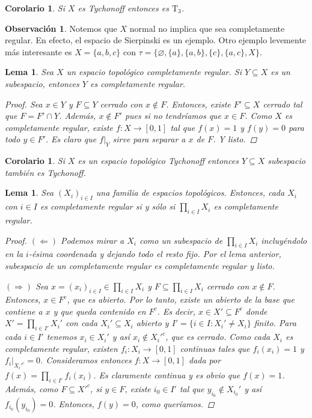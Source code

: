 \documentclass[12pt]{book}
\newtheorem{lem}[teo]{Lema}
\newtheorem{cor}[teo]{Corolario}
\theoremstyle{definition}
\newtheorem{obs}[teo]{Observación}
\let\emptyset\varnothing
\begin{document}
\begin{cor}
Si $X$ es Tychonoff entonces es $\mathrm{T}_3$.
\end{cor}

\begin{obs}
Notemos que $X$ normal no implica que sea completamente regular. En efecto, el espacio de Sierpinski es un ejemplo. Otro ejemplo levemente más interesante es $X=\{a,b,c\}$ con $\tau=\{\emptyset, \{a\}, \{a,b\}, \{c\}, \{a,c\},X\}$.
\end{obs}

\begin{lem}
Sea $X$ un espacio topológico completamente regular. Si $Y\subseteq X$ es un subespacio, entonces $Y$ es completamente regular.
\begin{proof}
Sea $x\in Y$ y $F\subseteq Y$ cerrado con $x\notin F$. Entonces, existe $F'\subseteq X$ cerrado tal que $F=F'\cap Y$. Además, $x\notin F'$ pues si no tendríamos que $x\in F$. Como $X$ es completamente regular, existe $f: X\to [0,1]$ tal que $f(x)=1$ y $f(y)=0$ para todo $y\in F'$. Es claro que $\left. f\right|_{Y}$ sirve para separar a $x$ de $F$. Y listo.
\end{proof}
\end{lem}

\begin{cor}
Si $X$ es un espacio topológico Tychonoff entonces $Y\subseteq X$ subespacio también es Tychonoff.
\end{cor}

\begin{lem}
Sea $(X_i)_{i\in I}$ una familia de espacios topológicos. Entonces, cada $X_i$ con ${i\in I}$ es completamente regular si y sólo si $\displaystyle\prod_{i\in I}X_i$ es completamente regular.
\begin{proof}
$(\Longleftarrow)$ Podemos mirar a $X_i$ como un subespacio de $\displaystyle\prod_{i\in I}X_i$ incluyéndolo en la $i$-ésima coordenada y dejando todo el resto fijo. Por el lema anterior, subespacio de un completamente regular es completamente regular y listo.

$(\Longrightarrow)$ Sea $x = (x_i)_{i\in I}\in\displaystyle\prod_{i\in I}X_i$ y $F\subseteq \displaystyle\prod_{i\in I}X_i$ cerrado con $x\notin F$. Entonces, $x\in F^c$, que es abierto. Por lo tanto, existe un abierto de la base que contiene a $x$ y que queda contenido en $F^c$. Es decir, $x\in X'\subseteq F^c$ donde $X' = \displaystyle\prod_{i\in I'} X_i'$ con cada $X_i'\subseteq X_i$ abierto y $I' =\{i\in I : X_i' \neq X_i\}$ finito. Para cada $i\in I'$ tenemos $x_i\in X_i'$ y así $x_i\notin X_i'^c$, que es cerrado. Como cada $X_i$ es completamente regular, existen $f_i:X_i\to [0,1]$ continuas tales que $f_i(x_i) = 1$ y $\left. f_i\right|_{X_i'^c} = 0$. Consideramos entonces $f:X\to [0,1]$ dada por $f(x) = \displaystyle\prod_{i\in I'}f_i(x_i)$. Es claramente continua y es obvio que $f(x)=1$. Además, como $F\subseteq X'^c$, si $y\in F$, existe $i_0\in I'$ tal que $y_{i_0}\notin X_{i_0}'$ y así $f_{i_0}(y_{i_0})=0$. Entonces, $f(y)=0$, como queríamos.
\end{proof}
\end{lem}
\end{document}
